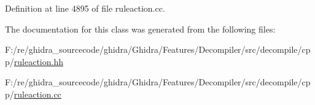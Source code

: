 Definition at line 4895 of file ruleaction.\+cc.



The documentation for this class was generated from the following files\+:\begin{DoxyCompactItemize}
\item 
F\+:/re/ghidra\+\_\+sourcecode/ghidra/\+Ghidra/\+Features/\+Decompiler/src/decompile/cpp/\mbox{\hyperlink{ruleaction_8hh}{ruleaction.\+hh}}\item 
F\+:/re/ghidra\+\_\+sourcecode/ghidra/\+Ghidra/\+Features/\+Decompiler/src/decompile/cpp/\mbox{\hyperlink{ruleaction_8cc}{ruleaction.\+cc}}\end{DoxyCompactItemize}
